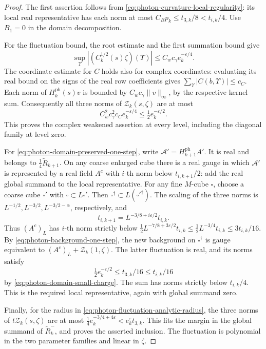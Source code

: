 \documentclass[11pt,letterpaper,reqno]{amsart}
\begin{document}
\begin{proof}
The first assertion follows from
\eqref{eq:photon-curvature-local-regularity}: its local real
representative has each norm at most
$C_Bp_k\le t_{3,k}/8<t_{i,k}/4$. Use $B_1=0$ in the domain
decomposition.

For the fluctuation bound, the root estimate and the first
summation bound give
\[
 \sup_\Upsilon|(C_k^{1/2}(s)\zeta)(\Upsilon)|
                         \le C_wc_\gamma e_k^{-\varepsilon/4}.
\]
The coordinate estimate for $C$ holds also for complex
coordinates: evaluating its real bound on the signs of the real
row coefficients gives $\sum_\Upsilon|C(b,\Upsilon)|\le c_C$.
Each norm of $H_k^{\mathrm{ph}}(s)v$ is bounded by
$C_wc_\gamma\|v\|_\infty$, by the respective kernel sum.
Consequently all three norms of $\mathscr Z_k(s,\zeta)$ are at most
\[
 C_w^2c_\gamma^2c_Ce_k^{-\varepsilon/4}
                                     \le\tfrac12e_k^{-\varepsilon/2}.
\]
This proves the complex weakened assertion at every level,
including the diagonal family at level zero.

For \eqref{eq:photon-domain-preserved-one-step}, write
$\mathscr A'=H_{k+1}^{\mathrm{ph}}A'$. It is real and belongs to
$\frac14\widetilde R_{k+1}$. On any coarse enlarged cube there
is a real gauge in which $\mathscr A'$ is represented by a real
field $A^c$ with $i$-th norm below $t_{i,k+1}/2$: add the real
global summand to the local representative. For any fine
$M$-cube $\square$, choose a coarse cube $\square'$ with
$\square\subset L\square'$. Then
$\square^\dagger\subset L(\square'^\dagger)$.
The scaling of the three norms is
$L^{-1/2},L^{-3/2},L^{-3/2-\alpha}$, respectively, and
\[
 t_{i,k+1}=L^{-3/8+i\varepsilon/2}t_{i,k}.
\]
Thus $(A^c)_L$ has $i$-th norm strictly below
$\frac12L^{-7/8+3\varepsilon/2}t_{i,k}
\le\frac12L^{-3/4}t_{i,k}\le3t_{i,k}/16$.
By \eqref{eq:photon-background-one-step}, the new background on
$\square^\dagger$ is gauge equivalent to
$(A^c)_L+\mathscr Z_k(1,\zeta)$. The latter fluctuation is real,
and its norms satisfy
\[
 \tfrac12e_k^{-\varepsilon/2}\le t_{3,k}/16\le t_{i,k}/16
\]
by \eqref{eq:photon-domain-small-charge}. The sum has norms
strictly below $t_{i,k}/4$. This is the required local
representative, again with global summand zero.

Finally, for the radius in \eqref{eq:photon-fluctuation-analytic-radius},
the three norms of $t\mathscr Z_k(s,\zeta)$ are at most
$\frac14e_k^{-3/4+4\varepsilon}<e_k^\varepsilon t_{3,k}$.
This fits the margin in the global summand of $\widetilde R_k^-$,
and proves the asserted inclusion. The fluctuation is polynomial
in the two parameter families and linear in $\zeta$.
\end{proof}
\end{document}
